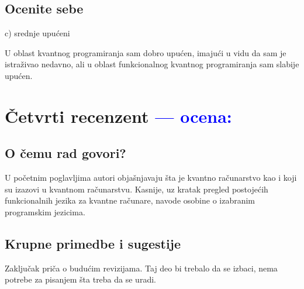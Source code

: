 \documentclass[a4paper]{report}
\newcommand{\odgovor}[1]{\textcolor{blue}{#1}}
\begin{document}
\section{Ocenite sebe}
 c) srednje upućeni

U oblast kvantnog programiranja sam dobro upućen, imajući u vidu da sam je istraživao nedavno, ali u oblast funkcionalnog kvantnog programiranja sam slabije upućen.


\chapter{Četvrti recenzent \odgovor{--- ocena:} }

\section{O čemu rad govori?}
U početnim poglavljima autori objašnjavaju šta je kvantno računarstvo kao i koji su izazovi u kvantnom računarstvu. Kasnije, uz kratak pregled postojećih funkcionalnih jezika za kvantne računare, navode osobine o izabranim programskim jezicima.

\section{Krupne primedbe i sugestije}
Zaključak priča o budućim revizijama. Taj deo bi trebalo da se izbaci, nema potrebe za pisanjem šta treba da se uradi. 
\end{document}
